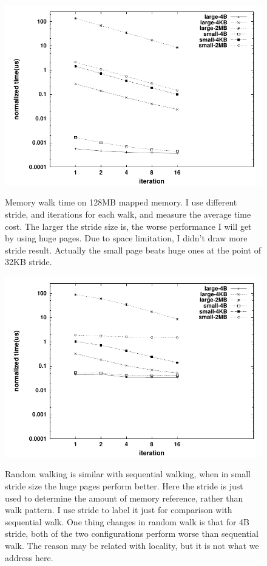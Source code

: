 \begin{figure}[hbt]
\centering
\includegraphics[width=0.9\linewidth]{../figures/hugetlb_128m}
\label{fig:hugetlb-time}
\caption{Memory walk time on 128MB mapped memory. I use different stride, and
iterations for each walk, and measure the average time cost. The larger the 
stride size is, the worse performance I will get by using huge pages. Due to
space limitation, I didn't draw more stride result. Actually the small page
beats huge ones at the point of 32KB stride.}
\end{figure}
\begin{figure}[h]
\includegraphics[width=0.9\linewidth]{../figures/hugetlb_rand_128m}
\label{fig:hugetlb-time}
\caption{Random walking is similar with sequential walking, when in small stride
size the huge pages perform better. Here the stride is just used to determine the 
amount of memory reference, rather than walk pattern. I use stride to label it
just for comparison with sequential walk. One thing changes in random walk is
that for 4B stride, both of the two configurations perform worse than
sequential walk. The reason may be related with locality, but it is not what we
address here.}
\end{figure}

